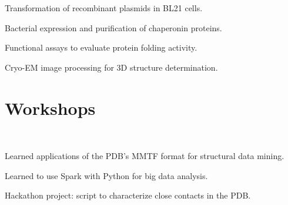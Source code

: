 \documentclass[]{deedy-resume-openfont}
\begin{document}
\begin{minipage}[t]{0.66\textwidth}

\begin{tightemize}
\item Transformation of recombinant plasmids in BL21 cells. \item Bacterial expression and purification of chaperonin proteins.\item Functional assays to evaluate protein folding activity. \item Cryo-EM image processing for 3D structure determination.\end{tightemize}
\sectionsep


\section{Workshops}
\\
\begin{tightemize}
\item Learned applications of the PDB's MMTF format for structural data mining.
\item Learned to use Spark with Python for big data analysis. \item Hackathon project:  script to characterize close contacts in the PDB. \end{tightemize}
\sectionsep



\end{minipage}
\end{document}
